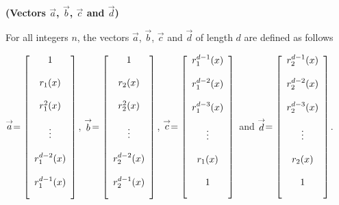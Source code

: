    \begin{definition}{\textbf{(Vectors $\stackrel{\rightarrow}{a}$, $\stackrel{\rightarrow}{b} $, $\stackrel{\rightarrow}{c}$ and $\stackrel{\rightarrow}{d}$)}}
   
\noindent For all integers $n$, the vectors $\stackrel{\rightarrow}{a}$, $\stackrel{\rightarrow}{b} $, $\stackrel{\rightarrow}{c}$ and $\stackrel{\rightarrow}{d}$ of length $d$ are defined as follows
  \begin{center}
  $ \stackrel{\rightarrow}{a} = 
 \left[\begin{array}{c}
           \bigskip 
           1\\
            \bigskip 
	 	   r_1(x)\\
	 	    \bigskip 
	       r_1^2(x)\\
	        \bigskip 
	       \vdots\\
	        \bigskip 
	       r_1^{d-2}(x)\\
	       \bigskip 
	       r_1^{d-1}(x)
\end{array}
\right]$, $ \stackrel{\rightarrow}{b} = 
 \left[\begin{array}{c}
           \bigskip 
           1\\
            \bigskip 
	 	   r_2(x)\\
	 	    \bigskip 
	       r_2^2(x)\\
	        \bigskip 
	       \vdots\\
	        \bigskip 
	       r_2^{d-2}(x)\\
	       \bigskip 
	       r_2^{d-1}(x)
\end{array}
\right]$, $ \stackrel{\rightarrow}{c} = 
 \left[\begin{array}{c}
           \bigskip 
           r_1^{d-1}(x)\\
            \bigskip 
	 	   r_1^{d-2}(x)\\
	 	    \bigskip 
	       r_1^{d-3}(x)\\
	        \bigskip 
	       \vdots\\
	        \bigskip 
	       r_1(x)\\
	       \bigskip 
	       1
\end{array}
\right]$ and $ \stackrel{\rightarrow}{d} = 
 \left[\begin{array}{c}
           \bigskip 
           r_2^{d-1}(x)\\
            \bigskip 
	 	   r_2^{d-2}(x)\\
	 	    \bigskip 
	       r_2^{d-3}(x)\\
	        \bigskip 
	       \vdots\\
	        \bigskip 
	       r_2(x)\\
	       \bigskip 
	       1
\end{array}
\right]$.
 \end{center}
 \end{definition}
